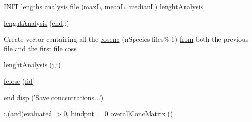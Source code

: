 \begin{DoxyCompactItemize}
\item 
I\+N\+I\+T lengths \hyperlink{a00032_abf6e5638a23a2531114655f3f690b70c}{analysis} \hyperlink{a00025_a10e64101d80ef71182bd7b1250e59135}{file} (max\+L, mean\+L, median\+L) \hyperlink{a00025_a3b1ab2e105a6a3b8ed1ee6b0b0f11792}{lenght\+Analysis}
\item 
\hyperlink{a00025_a7a3c9de2d82a97c217e41d93905be493}{lenght\+Analysis} (\hyperlink{a00025_afb358f48b1646c750fb9da6c6585be2b}{end},\+:)
\item 
Create vector containing all the \hyperlink{a00025_a52f1bbbf72ac97a5d451adc330decd0b}{coseno} (n\+Species files\%-\/1) \hyperlink{a00028_aa7b4fe13e75a69fca72862effeaf6196}{from} both the previous \hyperlink{a00110_a4e8353d6c62cf54bf4a1a8f63e56b8c3}{file} \hyperlink{a00028_a170f8acb213f91bf71c77b1d20bceb33}{and} the first \hyperlink{a00110_a4e8353d6c62cf54bf4a1a8f63e56b8c3}{file} \hyperlink{a00025_aef980037b6271b6ab8be33ae415ef453}{coss}
\item 
\hyperlink{a00025_a3b1ab2e105a6a3b8ed1ee6b0b0f11792}{lenght\+Analysis} (\hyperlink{a00110_ac86694252f8dfdb19aaeadc4b7c342c6}{j},\+:)
\item 
\hyperlink{a00025_a5e769bbbabcaddc548203741c7100228}{fclose} (\hyperlink{a00031_ae9011d40c6f13e68e6f07156e0da7c5d}{fid})
\item 
\hyperlink{a00025_afb358f48b1646c750fb9da6c6585be2b}{end} \hyperlink{a00025_a2985ef58c816724bba3cccbf43c4f936}{disp} ('Save concentrations...')
\item 
\+:,(\hyperlink{a00028_a170f8acb213f91bf71c77b1d20bceb33}{and}(\hyperlink{a00025_a5e1fe2a8074aede6ad4a7a0613f0f91c}{evaluated} $>$0, \hyperlink{a00025_abe7c50c8b184b4269ba5aaecedcd5457}{bindpnt}==0 \hyperlink{a00025_a576dd8edd1b0fd4cc65709a59b308518}{overall\+Conc\+Matrix} ()
\end{DoxyCompactItemize}

